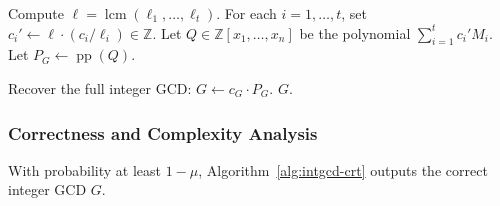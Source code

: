 \documentclass{article}
\numberwithin{equation}{section}
\begin{document}
\begin{algorithm}[p]
\begin{algorithmic}[1]
\State Compute $\ell = \operatorname{lcm}(\ell_1, \dots, \ell_t)$.
\State For each $i = 1,\dots,t$, set $c_i' \gets \ell \cdot (c_i / \ell_i) \in \mathbb{Z}$.
\State Let $Q \in \mathbb{Z}[x_1,\dots,x_n]$ be the polynomial $\sum_{i=1}^t c_i' M_i$.
\State Let $P_G \gets \operatorname{pp}(Q)$.

\State Recover the full integer GCD: $G \gets c_G \cdot P_G$.
\State \Return $G$.

\end{algorithmic}
\end{algorithm}



\subsubsection*{Correctness and Complexity Analysis}


\begin{theorem}
With probability at least \(1-\mu\), Algorithm~\ref{alg:intgcd-crt} outputs the correct integer GCD \(G\).
\end{theorem}
\end{document}
